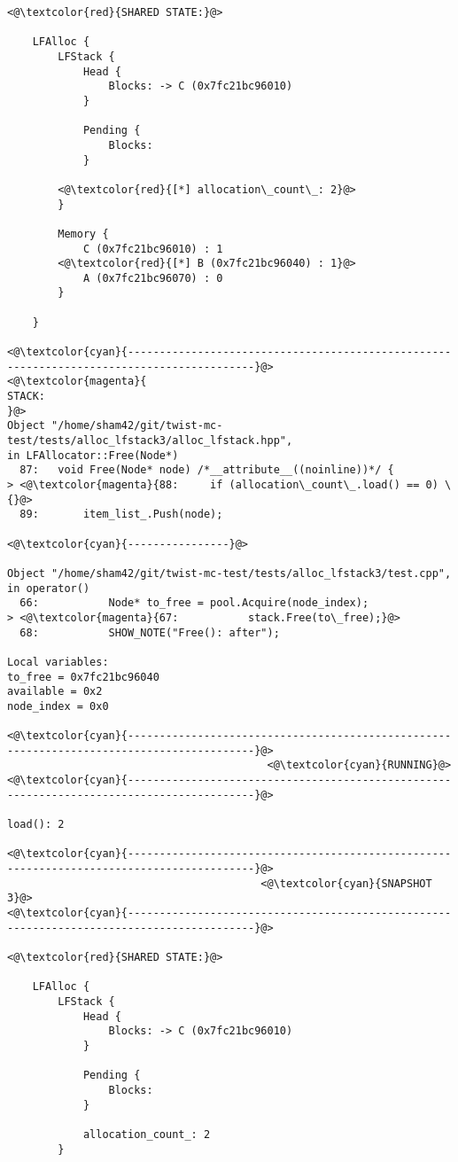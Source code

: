 \begin{adjustwidth}{-3.3cm}{-1cm}
\begin{allintypewriter}
\begin{multicols*}{2}
\begin{lstlisting}[numbers=none]
<@\textcolor{red}{SHARED STATE:}@>

    LFAlloc {
	    LFStack {
		    Head {
			    Blocks: -> C (0x7fc21bc96010) 
		    }

		    Pending {
			    Blocks: 
		    }

		<@\textcolor{red}{[*] allocation\_count\_: 2}@>
	    }

	    Memory {
		    C (0x7fc21bc96010) : 1
		<@\textcolor{red}{[*] B (0x7fc21bc96040) : 1}@>
		    A (0x7fc21bc96070) : 0
	    }

    }

<@\textcolor{cyan}{------------------------------------------------------------------------------------------}@>
<@\textcolor{magenta}{
STACK:
}@>
Object "/home/sham42/git/twist-mc-test/tests/alloc_lfstack3/alloc_lfstack.hpp",
in LFAllocator::Free(Node*)
  87:   void Free(Node* node) /*__attribute__((noinline))*/ {
> <@\textcolor{magenta}{88:     if (allocation\_count\_.load() == 0) \{}@>
  89:       item_list_.Push(node);

<@\textcolor{cyan}{----------------}@>

Object "/home/sham42/git/twist-mc-test/tests/alloc_lfstack3/test.cpp",
in operator()
  66:           Node* to_free = pool.Acquire(node_index);
> <@\textcolor{magenta}{67:           stack.Free(to\_free);}@>
  68:           SHOW_NOTE("Free(): after");

Local variables: 
to_free = 0x7fc21bc96040
available = 0x2
node_index = 0x0

<@\textcolor{cyan}{------------------------------------------------------------------------------------------}@>
                                         <@\textcolor{cyan}{RUNNING}@>
<@\textcolor{cyan}{------------------------------------------------------------------------------------------}@>

load(): 2

<@\textcolor{cyan}{------------------------------------------------------------------------------------------}@>
                                        <@\textcolor{cyan}{SNAPSHOT 3}@>
<@\textcolor{cyan}{------------------------------------------------------------------------------------------}@>

<@\textcolor{red}{SHARED STATE:}@>

    LFAlloc {
	    LFStack {
		    Head {
			    Blocks: -> C (0x7fc21bc96010) 
		    }

		    Pending {
			    Blocks: 
		    }

		    allocation_count_: 2
	    }


\end{lstlisting}
\end{multicols*}
\end{allintypewriter}
\end{adjustwidth}
